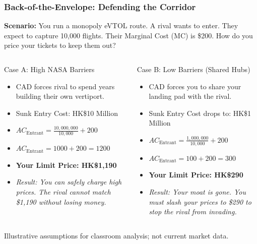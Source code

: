 \documentclass{beamer}
\begin{document}
\begin{frame}[t, shrink=10]
  \frametitle{Back-of-the-Envelope: Defending the Corridor}
  
  \textbf{Scenario:} You run a monopoly eVTOL route. A rival wants to enter. They expect to capture 10,000 flights. Their Marginal Cost (MC) is \$200. How do you price your tickets to keep them out?

  \vspace{0.3cm}
  \begin{columns}[T]
    \begin{column}{0.48\textwidth}
      \begin{block}{Case A: High NASA Barriers}
      \begin{itemize}
          \item CAD forces rival to spend years building their own vertiport.
          \item Sunk Entry Cost: HK\$10 Million
          \item $AC_{\text{Entrant}} = \frac{10,000,000}{10,000} + 200$
          \item $AC_{\text{Entrant}} = 1000 + 200 = 1200$
          \item \textbf{Your Limit Price: HK\$1,190}
          \item \textit{Result: You can safely charge high prices. The rival cannot match \$1,190 without losing money.}
      \end{itemize}
      \end{block}
    \end{column}

    \begin{column}{0.48\textwidth}
      \begin{block}{Case B: Low Barriers (Shared Hubs)}
      \begin{itemize}
          \item CAD forces you to share your landing pad with the rival.
          \item Sunk Entry Cost drops to: HK\$1 Million
          \item $AC_{\text{Entrant}} = \frac{1,000,000}{10,000} + 200$
          \item $AC_{\text{Entrant}} = 100 + 200 = 300$
          \item \textbf{Your Limit Price: HK\$290}
          \item \textit{Result: Your moat is gone. You must slash your prices to \$290 to stop the rival from invading.}
      \end{itemize}
      \end{block}
    \end{column}
  \end{columns}

\vfill
{\tiny Illustrative assumptions for classroom analysis; not current market data.}
\end{frame}
\end{document}
